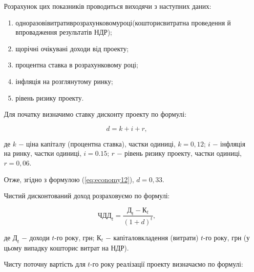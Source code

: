Розрахунок цих показників проводиться виходячи з наступних даних:

\begin{enumerate}
	\item одноразові\hfill витрати\hfill в\hfill розрахунковому\hfill році\hfill (кошторис\hfill витрат\hfill на\newline \hspace*{-20mm} проведення й впровадження результатів НДР);
	\item щорічні очікувані доходи від проекту;
	\item процентна ставка в розрахунковому році;
	\item інфляція на розглянутому ринку;
	\item рівень ризику проекту.
\end{enumerate}

Для початку визначимо ставку дисконту проекту по формулі:

\begin{equation}\label{eq:economy12}
	d = k + i + r,
\end{equation}

\noindent де $k$ $-$ ціна капіталу (процентна ставка), частки одиниці, $k = 0,12$;\newline
\hspace*{19pt}$i$ $-$ інфляція на ринку, частки одиниці, $i = 0.15$;\newline
\hspace*{19pt}$r$ $-$ рівень ризику проекту, частки одиниці, $r = 0,06$.

Отже, згідно з формулою (\ref{eq:economy12}), $d = 0,33$.

Чистий дисконтований доход розраховуємо по формулі:

\begin{equation}\label{eq:economy13}
	\text{ЧДД}_{t} = \frac{\text{Д}_{t} - \text{К}_{t}}{(1 + d)^{t}},
\end{equation}

\noindent де $\text{Д}_{t}$ $-$ доходи $t$-го року, грн;\newline
\hspace*{19pt}$\text{К}_{t}$ $-$ капіталовкладення (витрати) $t$-го року, грн (у цьому випадку\newline \hspace*{19pt}  кошторис витрат на НДР).

\vspace{1.5em}

Чисту поточну вартість для $t$-го року реалізації проекту визначаємо по формулі:


